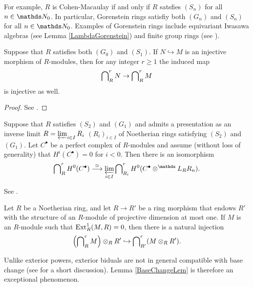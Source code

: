 \documentclass[a4paper, 
headsepline=off, DIV=12, titlepage=false]{scrartcl}
\begin{document}
\begin{rk}
For example, $R$ is Cohen-Macaulay if and only if $R$ satsfies $(S_n)$ for all $n \in \N_0$. In particular, Gorenstein rings satisfiy both $(G_n)$ and $(S_n)$ for all $n \in \N_0$. Examples of Gorenstein rings include equivariant Iwasawa algebras (see Lemma \ref{LambdaGorenstein}) and finite group rings (see \cite[p. 779]{CurtisReiner}).
\end{rk}


\begin{lem} \label{RyotarosLemma1}
Suppose that $R$ satisfies both $(G_0)$ and $(S_1)$. If $N \hookrightarrow M$ is an injective morphism of $R$-modules, then for any integer $r \geq 1$ the induced map
\[
\bigcap\nolimits^r_R N \to \bigcap\nolimits^r_R M
\] 
is injective as well. 
\end{lem}

\begin{proof} See \cite[Lemma C.1]{Sakamoto20}.
\end{proof}


\begin{lem} \label{BidualsLimits}
Suppose that $R$ satisfies $(S_2)$ and $(G_1)$ and admits a presentation as an inverse limit $R = \varprojlim_{i \in I} R_i$ $(R_i)_{i \in I}$ of Noetherian rings satisfying $(S_2)$ and $(G_1)$.
Let $C^\bullet$ be a perfect complex of $R$-modules and assume (without loss of generality) that $H^i (C^\bullet) = 0$ for $i < 0$. Then there is an isomorphism
\[
\bidual^r_R H^0 (C^\bullet) \stackrel{\simeq}{\longrightarrow} \varprojlim_{i \in I} \bidual^r_{R_i} H^0 (C^\bullet \otimes^\mathbb{L}_R R_n ).
\]
\end{lem}

\begin{proofbox}
See \cite[Lemma B.15]{Sakamoto20}.
\end{proofbox}

\begin{lem} \label{BaseChangeLem}
Let $R$ be a Noetherian ring, and let $R \to R'$ be a ring morphism that endows $R'$ with the structure of an $R$-module of projective dimension at most one. If $M$ is an $R$-module such that $\operatorname{Ext}^1_R (M, R) = 0$, then there is a natural injection
\[
\left ( \bigcap\nolimits^r_R M \right ) \otimes_R R' \hookrightarrow \bigcap\nolimits^r_{R'} ( M \otimes_R R'). 
\]
\end{lem}

\begin{rk}
Unlike exterior powers, exterior biduals are not in general compatible with base change (see \cite[Rem. B.9]{Sakamoto20} for a short discussion). Lemma \ref{BaseChangeLem} is therefore an exceptional phenomenon.
\end{rk}
\end{document}
